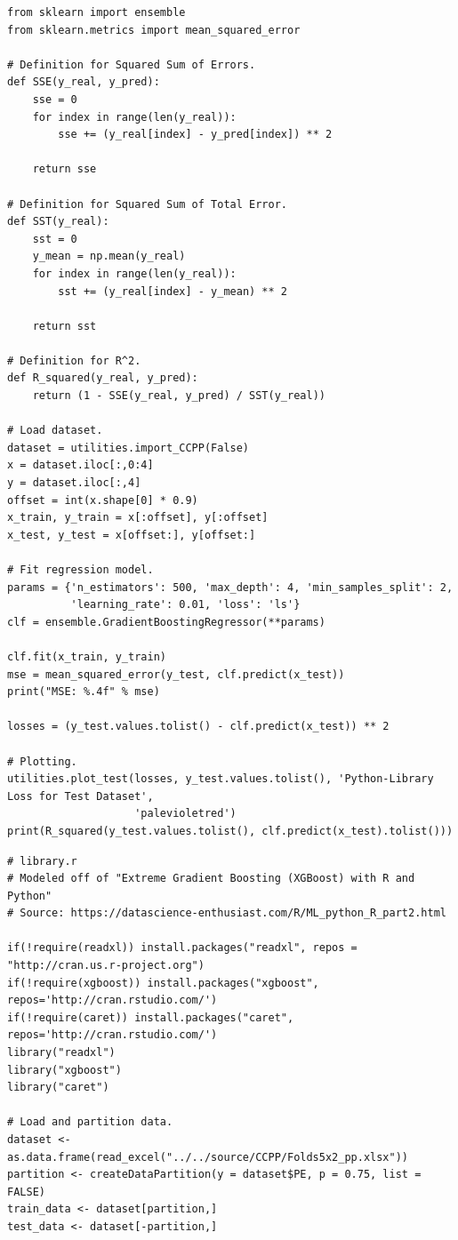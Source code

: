 \documentclass[letterpaper]{article} %
\begin{document}
{\begin{verbatim}
from sklearn import ensemble
from sklearn.metrics import mean_squared_error

# Definition for Squared Sum of Errors.
def SSE(y_real, y_pred):
    sse = 0
    for index in range(len(y_real)):
        sse += (y_real[index] - y_pred[index]) ** 2

    return sse

# Definition for Squared Sum of Total Error.
def SST(y_real):
    sst = 0
    y_mean = np.mean(y_real)
    for index in range(len(y_real)):
        sst += (y_real[index] - y_mean) ** 2

    return sst

# Definition for R^2.
def R_squared(y_real, y_pred):
    return (1 - SSE(y_real, y_pred) / SST(y_real))

# Load dataset.
dataset = utilities.import_CCPP(False)
x = dataset.iloc[:,0:4]
y = dataset.iloc[:,4]
offset = int(x.shape[0] * 0.9)
x_train, y_train = x[:offset], y[:offset]
x_test, y_test = x[offset:], y[offset:]

# Fit regression model.
params = {'n_estimators': 500, 'max_depth': 4, 'min_samples_split': 2,
          'learning_rate': 0.01, 'loss': 'ls'}
clf = ensemble.GradientBoostingRegressor(**params)

clf.fit(x_train, y_train)
mse = mean_squared_error(y_test, clf.predict(x_test))
print("MSE: %.4f" % mse)

losses = (y_test.values.tolist() - clf.predict(x_test)) ** 2

# Plotting.
utilities.plot_test(losses, y_test.values.tolist(), 'Python-Library Loss for Test Dataset',
                    'palevioletred')
print(R_squared(y_test.values.tolist(), clf.predict(x_test).tolist()))
\end{verbatim}
\bigskip
\begin{verbatim}
# library.r
# Modeled off of "Extreme Gradient Boosting (XGBoost) with R and Python"
# Source: https://datascience-enthusiast.com/R/ML_python_R_part2.html

if(!require(readxl)) install.packages("readxl", repos = "http://cran.us.r-project.org")
if(!require(xgboost)) install.packages("xgboost", repos='http://cran.rstudio.com/')
if(!require(caret)) install.packages("caret", repos='http://cran.rstudio.com/')
library("readxl")
library("xgboost")
library("caret")

# Load and partition data.
dataset <- as.data.frame(read_excel("../../source/CCPP/Folds5x2_pp.xlsx"))
partition <- createDataPartition(y = dataset$PE, p = 0.75, list = FALSE)
train_data <- dataset[partition,]
test_data <- dataset[-partition,]


\end{verbatim}}
\end{document}
